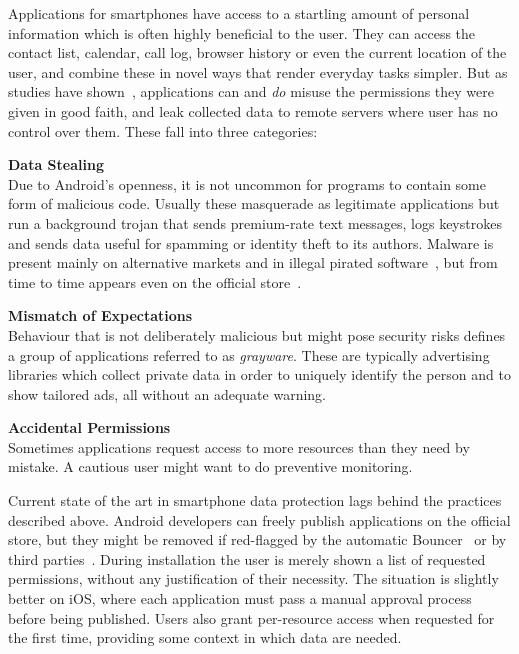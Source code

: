 \documentclass[12pt,twoside,notitlepage]{report}
\begin{document}
Applications for smartphones have access to a startling amount of personal information which is often highly beneficial to the user. They can access the contact list, calendar, call log, browser history or even the current location of the user, and combine these in novel ways that render everyday tasks simpler. But as studies have shown~\cite{web:Appthority, web:HuffingtonOneInThree}, applications can and \emph{do} misuse the permissions they were given in good faith, and leak collected data to remote servers where user has no control over them. These fall into three categories:
\begin{description}
\item \textbf{Data Stealing} \\
Due to Android's openness, it is not uncommon for programs to contain some form of malicious code. Usually these masquerade as legitimate applications but run a background trojan that sends premium-rate text messages, logs keystrokes and sends data useful for spamming or identity theft to its authors. Malware is present mainly on alternative markets and in illegal pirated software~\cite{Zhou:2012:DRS:2133601.2133640}, but from time to time appears even on the official store~\cite{web:LookoutPlayRemoval}.

\item \textbf{Mismatch of Expectations} \\
Behaviour that is not deliberately malicious but might pose security risks defines a group of applications referred to as \emph{grayware}. These are typically advertising libraries which collect private data in order to uniquely identify the person and to show tailored ads, all without an adequate warning.

\item \textbf{Accidental Permissions} \\
Sometimes applications request access to more resources than they need by mistake. A cautious user might want to do preventive monitoring. 
\end{description}

Current state of the art in smartphone data protection lags behind the practices described above. Android developers can freely publish applications on the official store, but they might be removed if red-flagged by the automatic Bouncer~\cite{web:Bouncer} or by third parties~\cite{web:LookoutPlayRemoval}. During installation the user is merely shown a list of requested permissions, without any justification of their necessity. The situation is slightly better on iOS, where each application must pass a manual approval process before being published. Users also grant per-resource access when requested for the first time, providing some context in which data are needed.
\end{document}
